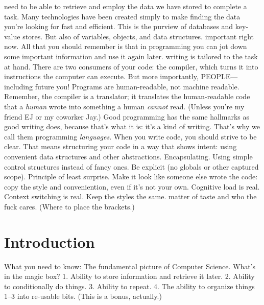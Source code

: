 need to be able to retrieve and employ the data we have stored to complete a
task. Many technologies have been created simply to make finding the data you're
looking for fast and efficient. This is the purview of databases and key-value
stores. But also of variables, objects, and data structures.
%
important right now. All that you should remember is that in programming you can
jot down some important information and use it again later.
%
%
writing is tailored to the task at hand. There are two consumers of your code:
the compiler, which turns it into instructions the computer can execute. But
more importantly, PEOPLE---including future you! Programs are human-readable,
not machine readable. Remember, the compiler is a translator; it translates the
human-readable code that a \emph{human} wrote into something a human
\emph{cannot} read. (Unless you're my friend EJ or my coworker Jay.) Good
programming has the same hallmarks as good writing does, because that's what it
is: it's a kind of writing. That's why we call them programming
\emph{languages}. When you write code, you should strive to be clear. That means
structuring your code in a way that shows intent: using convenient data
structures and other abstractions. Encapsulating. Using simple control
structures instead of fancy ones. Be explicit (no globals or other captured
scope). Principle of least surprise. Make it look like someone else wrote the
code: copy the style and conveniention, even if it's not your own. Cognitive
load is real. Context switching is real. Keep the styles the same.
%
matter of taste and who the fuck cares. (Where to place the brackets.)


\section{Introduction}
What you need to know: The fundamental picture of Computer Science. What's in
the magic box? 1. Ability to store information and retrieve it later. 2. Ability
to conditionally do things. 3. Ability to repeat. 4. The ability to organize
things 1--3 into re-usable bits. (This is a bonus, actually.)

